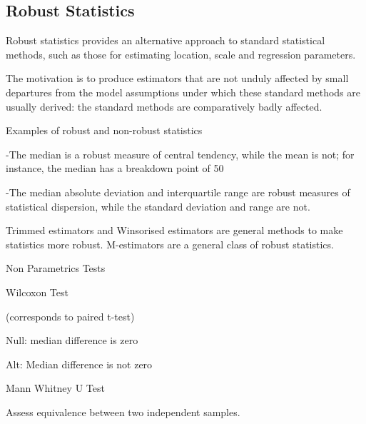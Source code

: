 
\subsection*{Robust Statistics}

Robust statistics provides an alternative approach to standard statistical methods, such as those for estimating location, scale and regression parameters. 


The motivation is to produce estimators that are not unduly affected by small departures from the model assumptions under which these standard methods are usually derived: the standard methods are comparatively badly affected.


Examples of robust and non-robust statistics

 -The median is a robust measure of central tendency, while the mean is not; for instance, the median has a breakdown point of 50%

 -The median absolute deviation and interquartile range are robust measures of statistical dispersion, while the standard deviation and range are not.


Trimmed estimators and Winsorised estimators are general methods to make statistics more robust. M-estimators are a general class of robust statistics.


Non Parametrics Tests


Wilcoxon Test 


(corresponds to paired t-test) 


Null: median difference is zero

Alt: Median difference is not zero


Mann Whitney U Test

Assess equivalence between two independent samples.

